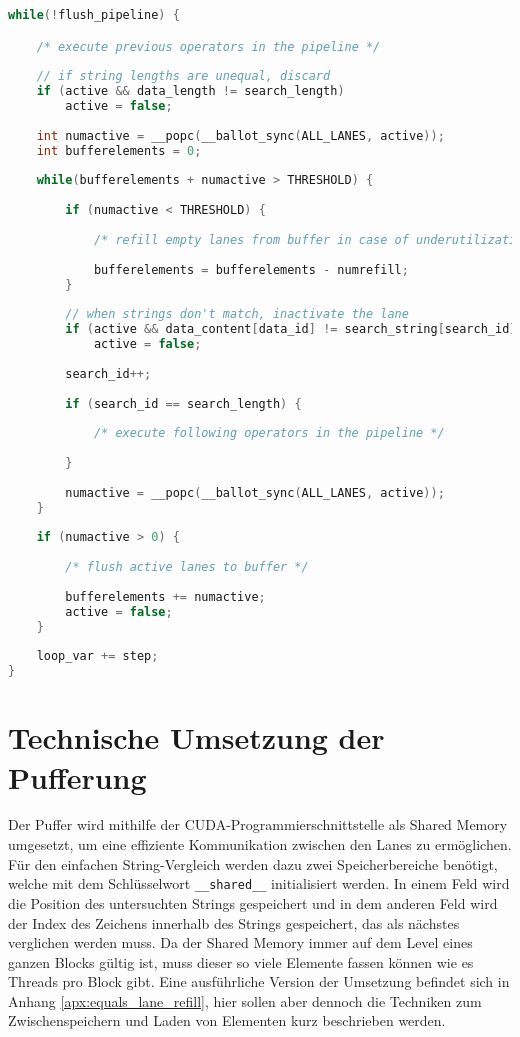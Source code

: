 \begin{lstlisting}[language=C++,
caption=Struktur der String-Selektion mit Lane Refill,
label=equals_lane_refill_code]
while(!flush_pipeline) {

	/* execute previous operators in the pipeline */
	
	// if string lengths are unequal, discard
	if (active && data_length != search_length)
		active = false;
	
	int numactive = __popc(__ballot_sync(ALL_LANES, active));
	int bufferelements = 0;
	
	while(bufferelements + numactive > THRESHOLD) {
	
		if (numactive < THRESHOLD) {
		
			/* refill empty lanes from buffer in case of underutilization */
			
			bufferelements = bufferelements - numrefill;
		}
		
		// when strings don't match, inactivate the lane
		if (active && data_content[data_id] != search_string[search_id])
			active = false;
		
		search_id++;
		
		if (search_id == search_length) {
		
			/* execute following operators in the pipeline */
		
		}
		
		numactive = __popc(__ballot_sync(ALL_LANES, active));
	}
		
	if (numactive > 0) {
	
		/* flush active lanes to buffer */
		
		bufferelements += numactive;
		active = false;
	}
	
	loop_var += step;
}
\end{lstlisting}

\section{Technische Umsetzung der Pufferung}

Der Puffer wird mithilfe der CUDA-Programmierschnittstelle als Shared Memory umgesetzt, um eine effiziente Kommunikation zwischen den Lanes zu ermöglichen.
Für den einfachen String-Vergleich werden dazu zwei Speicherbereiche benötigt, welche mit dem Schlüsselwort \texttt{\_\_shared\_\_} initialisiert werden.
In einem Feld wird die Position des untersuchten Strings gespeichert und in dem anderen Feld wird der Index des Zeichens innerhalb des Strings gespeichert, das als nächstes verglichen werden muss.
Da der Shared Memory immer auf dem Level eines ganzen Blocks gültig ist, muss dieser so viele Elemente fassen können wie es Threads pro Block gibt.
Eine ausführliche Version der Umsetzung befindet sich in Anhang \ref{apx:equals_lane_refill}, hier sollen aber dennoch die Techniken zum Zwischenspeichern und Laden von Elementen kurz beschrieben werden.

